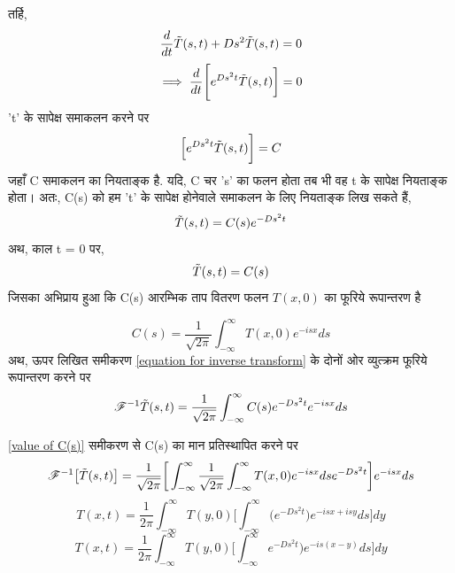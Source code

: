 \documentclass[10pt,a4paper,twoside]{article}
\begin{document}
तर्हि, 
\begin{equation}
    \frac{d}{dt} {\Tilde{T}(s,t)} + D s^2 \Tilde{T}(s,t) = 0
\end{equation}
\begin{equation}
    \implies \frac{d}{dt} \Bigg[ e^ {Ds^2t} \Tilde{T}(s,t)\bigg] = 0 %
\end{equation}
't' के सापेक्ष समाकलन करने पर
\begin{equation}
    \Big[ e^ {Ds^2t} \Tilde{T}(s,t) \bigg] = C
\end{equation}
जहाँ C समाकलन का नियताङ्क है. यदि, C चर 's' का फलन होता तब भी वह t के सापेक्ष नियताङ्क होता। अतः, C(s) को हम 't' के सापेक्ष होनेवाले समाकलन के लिए नियताङ्क लिख सकते हैं,
\begin{equation}
   \Tilde{T}(s,t) = C(s) e^ {-Ds^2t} \label{equation for inverse transform}
\end{equation}
अथ, काल t = 0 पर,
\begin{equation}
   \Tilde{T}(s,t) = C(s)
\end{equation}
 जिसका अभिप्राय हुआ कि C(s) आरम्भिक ताप वितरण फलन $T(x,0)$ का फूरिये रूपान्तरण है 
 
 \begin{equation}
    C(s) = \frac{1}{\sqrt{2\pi}} \int_{-\infty}^{\infty} T(x,0) e^{-isx} ds \label{value of C(s)}
\end{equation} 
 अथ, ऊपर लिखित समीकरण \ref{equation for inverse transform} के दोनों ओर व्युत्क्रम फूरिये रूपान्तरण करने पर 
 \begin{equation}
   \mathscr{F}^{-1} \Tilde{T}(s,t) =\frac{1}{\sqrt{2\pi}} \int_{-\infty}^{\infty} C(s) e^ {-Ds^2t} e^{-isx} ds  
\end{equation}

\ref{value of C(s)} समीकरण से C(s) का मान प्रतिस्थापित करने पर 
 \begin{equation}
   \mathscr{F}^{-1}\big[\Tilde{T}(s,t)\big] =\frac{1}{\sqrt{2\pi}} \bigg[ \int_{-\infty}^{\infty} \frac{1}{\sqrt{2\pi}} \int_{-\infty}^{\infty} T(x,0) e^{-isx} ds  e^ {-Ds^2t}\bigg] e^{-isx} ds  
\end{equation}
\begin{equation*}
    T(x,t) = \frac{1}{{2\pi}}\int_{-\infty}^{\infty} T(y,0) \bigg[ \int_{-\infty}^{\infty} \big(e^ {-Ds^2t} \big) e^{-isx + isy} ds  \bigg] dy 
\end{equation*}
\begin{equation}
    T(x,t) = \frac{1}{{2\pi}}\int_{-\infty}^{\infty} T(y,0) \bigg[ \int_{-\infty}^{\infty} e^ {-Ds^2t} \big) e^{-is(x-y)} ds  \bigg] dy 
\end{equation} 
\end{document}

